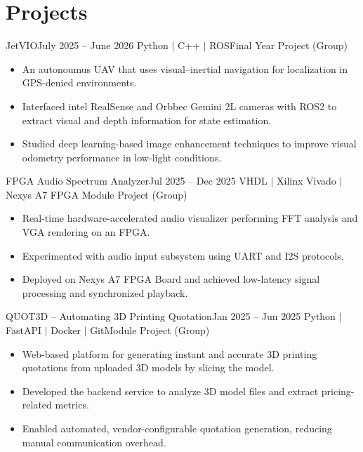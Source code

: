 \vspace{2pt}
\section{Projects}
\vspace{2pt}
\resumeSubHeadingListStart
\resumeSubheading
{JetVIO}{July 2025 -- June 2026}
{Python $|$ C++ $|$ ROS}{Final Year Project (Group)}
\begin{itemize}
    \item An autonoumus UAV that uses visual–inertial navigation for localization in GPS-denied environments.
    \item Interfaced intel RealSense and Orbbec Gemini 2L cameras with ROS2 to extract visual and depth information for state estimation.
    \item Studied deep learning-based image enhancement techniques to improve visual odometry performance in low-light conditions.
\end{itemize}

\resumeSubheading
{FPGA Audio Spectrum Analyzer\href{https://github.com/AkinduID/FPGA-Spectrum-Visualizer}{\faGithub}}{Jul 2025 -- Dec 2025}
{VHDL $|$ Xilinx Vivado $|$ Nexys A7 FPGA }{Module Project (Group)}
\begin{itemize}
    \item Real-time hardware-accelerated audio visualizer performing FFT analysis and VGA rendering on an FPGA.
    \item Experimented with audio input subsystem using UART and I2S protocols.
    \item Deployed on Nexys A7 FPGA Board and achieved low-latency signal processing and synchronized playback.
\end{itemize}

\resumeSubheading
{QUOT3D -- Automating 3D Printing Quotation}{Jan 2025 -- Jun 2025}
{Python $|$ FastAPI $|$ Docker $|$ Git}{Module Project (Group)}
\begin{itemize}
    \item Web-based platform for generating instant and accurate 3D printing quotations from uploaded 3D models by slicing the model.
    \item Developed the backend service to analyze 3D model files and extract pricing-related metrics.
    \item Enabled automated, vendor-configurable quotation generation, reducing manual communication overhead.
\end{itemize}

